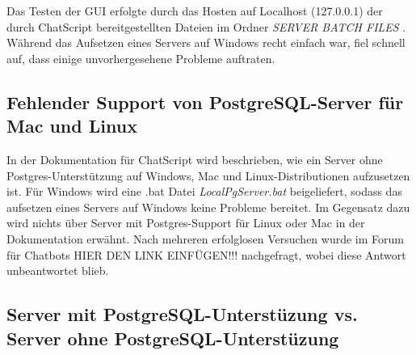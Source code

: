 Das Testen der GUI erfolgte durch das Hosten auf Localhost (127.0.0.1) der durch ChatScript bereitgestellten Dateien im Ordner \textit{SERVER BATCH FILES} \citep{chatscript2019}. Während das Aufsetzen eines Servers auf Windows recht einfach war, fiel schnell auf, dass einige unvorhergesehene Probleme auftraten. 

\subsection{Fehlender Support von PostgreSQL-Server für Mac und Linux}
\label{sec:Fehlender Support von PostgreSQL-Server für Mac und Linux}

In der Dokumentation für ChatScript wird beschrieben, wie ein Server ohne Postgres-Unterstützung auf Windows, Mac und Linux-Distributionen aufzusetzen ist. Für Windows wird eine .bat Datei \textit{LocalPgServer.bat} beigeliefert, sodass das aufsetzen eines Servers auf Windows keine Probleme bereitet. Im Gegensatz dazu wird nichts über Server mit Postgres-Support für Linux oder Mac in der Dokumentation erwähnt. Nach mehreren erfolglosen Versuchen wurde im Forum für Chatbots \textcolor[rgb]{1,0.68,0.36}{HIER DEN LINK EINFÜGEN!!!} nachgefragt, wobei diese Antwort unbeantwortet blieb. 

\subsection{Server mit PostgreSQL-Unterstüzung vs. Server ohne PostgreSQL-Unterstüzung}
\label{sec: Server mit PostgreSQL-Unterstüzung vs. Server ohne PostgreSQL-Unterstüzung}

